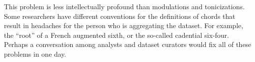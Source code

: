 
This problem is less intellectually profound than
modulations and tonicizations. Some researchers have
different conventions for the definitions of chords that
result in headaches for the person who is aggregating the
dataset. For example, the ``root'' of a French augmented
sixth, or the so-called cadential six-four. Perhaps a
conversation among analysts and dataset curators would fix
all of these problems in one day.

